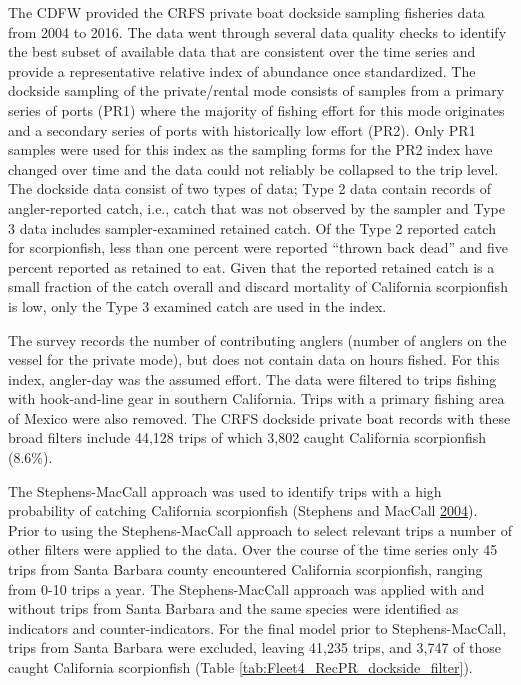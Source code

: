 \documentclass[12pt,]{article}
\begin{document}
The CDFW provided the CRFS private boat dockside sampling fisheries data
from 2004 to 2016. The data went through several data quality checks to
identify the best subset of available data that are consistent over the
time series and provide a representative relative index of abundance
once standardized. The dockside sampling of the private/rental mode
consists of samples from a primary series of ports (PR1) where the
majority of fishing effort for this mode originates and a secondary
series of ports with historically low effort (PR2). Only PR1 samples
were used for this index as the sampling forms for the PR2 index have
changed over time and the data could not reliably be collapsed to the
trip level. The dockside data consist of two types of data; Type 2 data
contain records of angler-reported catch, i.e., catch that was not
observed by the sampler and Type 3 data includes sampler-examined
retained catch. Of the Type 2 reported catch for scorpionfish, less than
one percent were reported ``thrown back dead'' and five percent reported
as retained to eat. Given that the reported retained catch is a small
fraction of the catch overall and discard mortality of California
scorpionfish is low, only the Type 3 examined catch are used in the
index.

The survey records the number of contributing anglers (number of anglers
on the vessel for the private mode), but does not contain data on hours
fished. For this index, angler-day was the assumed effort. The data were
filtered to trips fishing with hook-and-line gear in southern
California. Trips with a primary fishing area of Mexico were also
removed. The CRFS dockside private boat records with these broad filters
include 44,128 trips of which 3,802 caught California scorpionfish
(8.6\%).

The Stephens-MacCall approach was used to identify trips with a high
probability of catching California scorpionfish (Stephens and MacCall
\protect\hyperlink{ref-Stephens2004}{2004}). Prior to using the
Stephens-MacCall approach to select relevant trips a number of other
filters were applied to the data. Over the course of the time series
only 45 trips from Santa Barbara county encountered California
scorpionfish, ranging from 0-10 trips a year. The Stephens-MacCall
approach was applied with and without trips from Santa Barbara and the
same species were identified as indicators and counter-indicators. For
the final model prior to Stephens-MacCall, trips from Santa Barbara were
excluded, leaving 41,235 trips, and 3,747 of those caught California
scorpionfish (Table \ref{tab:Fleet4_RecPR_dockside_filter}).
\end{document}
